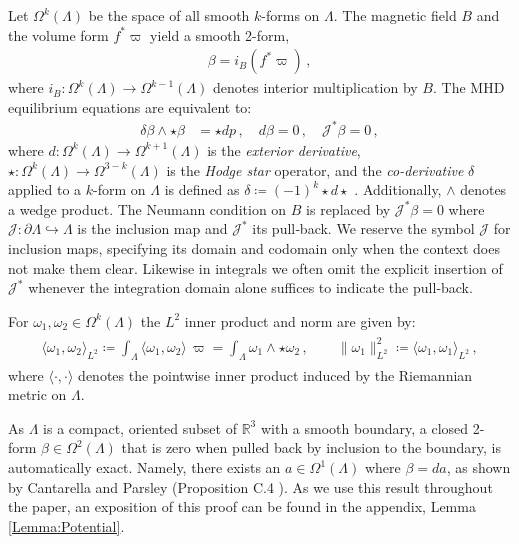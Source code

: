 \documentclass[11pt]{article}
\theoremstyle{plain}
\theoremstyle{definition}
\theoremstyle{remark}
\newcommand{\R}{\mathbb{R}}
\newcommand{\ST}{\Lambda}
\begin{document}
Let \(\Omega^k(\ST)\) be the space of all smooth \(k\)-forms on \(\ST\). The magnetic field $B$ and the volume form $f^*\varpi$ yield a smooth 2-form,
\begin{align*}
   \beta = i_B ( f^*\varpi ) \, ,
\end{align*}
where \(i_B : \Omega^k(\ST) \to \Omega^{k-1}(\ST)\) denotes interior multiplication by \(B\). The MHD equilibrium equations are equivalent to:
\begin{align} \label{eq:mhe_original}
  \delta \beta  \wedge \star \beta  &= \star dp \, , \quad
  d \beta  = 0 \, , \quad \mathcal{J}^* \beta  = 0 \, ,
\end{align}
where $d:\Omega^k(\ST)\to \Omega^{k+1}(\ST)$ is the \emph{exterior derivative}, $\star:\Omega^k(\ST)\to\Omega^{3-k}(\ST)$ is the \emph{Hodge star} operator, and the \emph{co-derivative} \(\delta\) applied to a \(k\)-form on \(\ST\) is defined as \(\delta \coloneqq (-1)^k \star d \star\) \cite{lee}. Additionally, \(\wedge\) denotes a wedge product. The Neumann condition on \(B\) is replaced by \(\mathcal{J}^* \beta  = 0\) where \(\mathcal{J}\colon \partial\ST \hookrightarrow \ST\) is the inclusion map and \(\mathcal{J}^*\) its pull‐back. We reserve the symbol \(\mathcal{J}\) for inclusion maps, specifying its domain and codomain only when the context does not make them clear. Likewise in integrals we often omit the explicit insertion of \(\mathcal{J}^*\) whenever the integration domain alone suffices to indicate the pull‐back. 





For \(\omega_1, \omega_2 \in \Omega^k (\ST)\) the \(L^2\) inner product and norm are given by:
\begin{align*}
\begin{gathered}
  \langle \omega_1, \omega_2 \rangle_{L^2} \coloneqq \int_{\ST} \langle \omega_1 ,\omega_2 \rangle \, \varpi = \int_{\ST} \omega_1 \wedge \star \omega_2 \, , \qquad
  \| \omega_1 \|_{L^2}^2 \coloneqq \langle \omega_1, \omega_1 \rangle_{L^2} \, ,
\end{gathered}
\end{align*}
where \(\langle \cdot , \cdot \rangle\) denotes the pointwise inner product induced by the Riemannian metric on \(\ST\).




As \(\ST\) is a compact, oriented subset of \(\R^3\) with a smooth boundary, a closed 2-form \(\beta  \in  \Omega^2(\ST)\) that is zero when pulled back by inclusion to the boundary, is automatically exact. Namely, there exists an \(a \in  \Omega^1(\ST) \) where \(\beta  = da\), as shown by Cantarella and Parsley (Proposition C.4 \cite{CANTARELLA20101127}). As we use this result throughout the paper, an exposition of this proof can be found in the appendix, Lemma \ref{Lemma:Potential}. 
\end{document}
